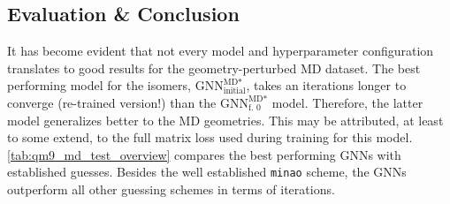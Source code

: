\subsection{Evaluation \& Conclusion}
\label{sec:qm9_md_isomers_conclusion}
It has become evident that not every model and hyperparameter configuration translates to good results for the geometry-perturbed MD dataset. The best performing model for the isomers, $\text{GNN}^{\text{MD*}}_\text{initial}$, takes an iterations longer to converge (re-trained version!) than the $\text{GNN}^{\text{MD*}}_\text{f. 0}$ model. Therefore, the latter model generalizes better to the MD geometries. This may be attributed, at least to some extend, to the full matrix loss used during training for this model. \autoref{tab:qm9_md_test_overview} compares the best performing GNNs with established guesses. Besides the well established \texttt{minao} scheme, the GNNs outperform all other guessing schemes in terms of iterations. 
